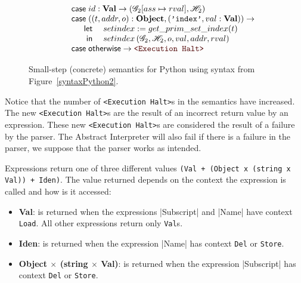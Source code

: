 \begin{figure}
\[\begin{array}[t]{l}
    \qquad \casem{id: \mathbf{Val}} \to \left(\Glo_2[ass \mapsto rval], \Hea_2\right) \\
    \qquad \casem{((t, addr, o): \mathbf{Object}, (\texttt{'index'}, val: \mathbf{Val}))} \to \\
    \qquad\quad\begin{array}[t]{rl}
            \letm& setindex := get\_prim\_set\_index(t) \\
             \inm& setindex\left(\Glo_2, \Hea_2, o, val, addr, rval\right) \\
    \end{array} \\
    \qquad \casem{\textsf{otherwise}} \to \Halt \\
  \end{array}\]
\caption{Small-step (concrete) semantics for Python using syntax from
  Figure~\ref{syntaxPython2}.\label{smallstep2}}
\end{figure}

Notice that the number of \verb+<Execution Halt>+s in the semantics have increased. The
new \verb+<Execution Halt>+s are the result of an incorrect return value by an expression.
These new \verb+<Execution Halt>+s are considered the result of a failure by the parser.
The Abstract Interpreter will also fail if there is a failure in the parser, we suppose
that the parser works as intended.

Expressions return one of three different values
\verb|(Val + (Object x (string x Val)) + Iden)|. The value returned depends on the
context the expression is called and how is it accessed:

\begin{itemize}
\tightlist
\item \textbf{Val}: is returned when the expressions \pycode|Subscript| and \pycode|Name|
  have context \verb|Load|. All other expressions return only \verb|Val|s.
\item \textbf{Iden}: is returned when the expression \pycode|Name| has context \verb|Del|
  or \verb|Store|.
\item \textbf{Object $\times$ (string $\times$ Val)}: is returned when the expression \pycode|Subscript|
  has context \verb|Del| or \verb|Store|.
\end{itemize}

%

